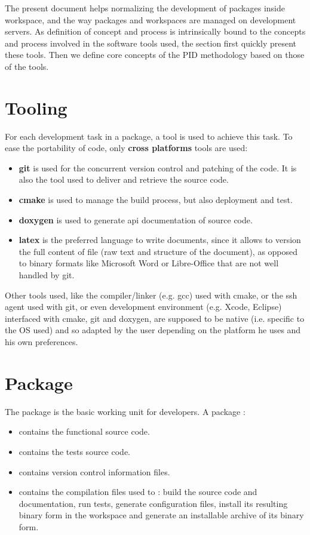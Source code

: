 \documentclass[12pt,a4paper]{article}
\begin{document}
The present document helps normalizing the development of packages inside workspace, and the way packages and workspaces are managed on development servers. As definition of concept and process is intrinsically bound to the concepts and process involved in the software tools used, the section first quickly present these tools. Then we define core concepts of the PID methodology based on those of the tools.
 
\section{Tooling}

For each development task in a package, a tool is used to achieve this task. To ease the portability of code, only \textbf{cross platforms} tools are used:
\begin{itemize}
\item \textbf{git} is used for the concurrent version control and patching of the code. It is also the tool used to deliver and retrieve the source code.
\item \textbf{cmake} is used to manage the build process, but also deployment and test.
\item \textbf{doxygen} is used to generate api documentation of source code.
\item \textbf{latex} is the preferred language to write documents, since it allows to version the full content of file (raw text and structure of the document), as opposed to binary formats like Microsoft Word or Libre-Office that are not well handled by git.
\end{itemize}

Other tools used, like the compiler/linker (e.g. gcc) used with cmake, or the ssh agent used with git, or even development environment (e.g. Xcode, Eclipse) interfaced with cmake, git and doxygen, are supposed to be native (i.e. specific to the OS used) and so adapted by the user depending on the platform he uses and his own preferences.

\section{Package}
\label{sec:Package}

The package is the basic working unit for developers. A package :
\begin{itemize}
\item contains the functional source code.
\item contains the tests source code.
\item contains version control information files.
\item contains the compilation files used to : build the source code and documentation, run tests, generate configuration files, install its resulting binary form in the workspace and generate an installable archive of its binary form.
\end{itemize}
\end{document}
